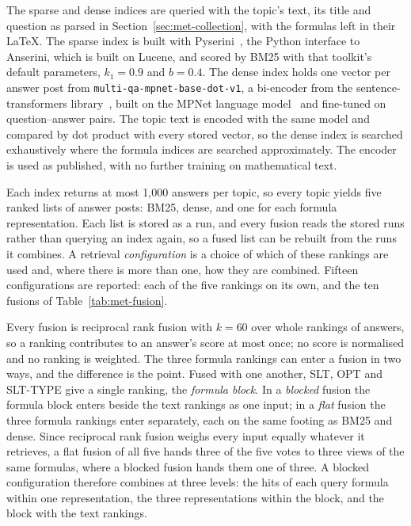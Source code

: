 The sparse and dense indices are queried with the topic's text, its title and question as
parsed in Section~\ref{sec:met-collection}, with the formulas left in their \LaTeX{}. The
sparse index is built with Pyserini~\cite{lin2021pyserini}, the Python interface to Anserini,
which is built on Lucene, and scored by BM25 with that toolkit's default parameters, $k_1 = 0.9$ and
$b = 0.4$. The dense index holds one vector per answer post from
\texttt{multi-qa-\allowbreak mpnet-\allowbreak base-\allowbreak dot-v1}, a bi-encoder from the sentence-transformers
library~\cite{reimers2019sbert}, built on the MPNet language model~\cite{song2020mpnet} and
fine-tuned on question--answer pairs. The topic text is encoded with the same model and
compared by dot product with every stored vector, so the dense index is searched exhaustively
where the formula indices are searched approximately. The encoder is used as published, with no
further training on mathematical text.

Each index returns at most 1{,}000 answers per topic, so every topic yields five ranked lists of
answer posts: BM25, dense, and one for each formula representation. Each list is stored as a
run, and every fusion reads the stored runs rather than querying an index again, so a fused list
can be rebuilt from the runs it combines. A retrieval \emph{configuration} is a choice of which
of these rankings are used and, where there is more than one, how they are combined. Fifteen
configurations are reported: each of the five rankings on its own, and the ten fusions of
Table~\ref{tab:met-fusion}.

Every fusion is reciprocal rank fusion with $k = 60$ over whole rankings of answers, so a
ranking contributes to an answer's score at most once; no score is normalised and no ranking is
weighted. The three formula rankings can enter a fusion in two ways, and the difference is the
point. Fused with one another, SLT, OPT and SLT-TYPE give a single ranking, the \emph{formula
block}. In a \emph{blocked} fusion the formula block enters beside the text rankings as one
input; in a \emph{flat} fusion the three formula rankings enter separately, each on the same
footing as BM25 and dense. Since reciprocal rank fusion weighs every input equally whatever it
retrieves, a flat fusion of all five hands three of the five votes to three views of the same
formulas, where a blocked fusion hands them one of three. A blocked configuration therefore
combines at three levels: the hits of each query formula within one representation, the three
representations within the block, and the block with the text rankings.

